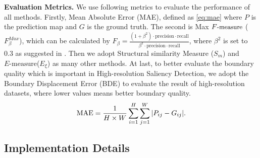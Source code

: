 \documentclass[10pt,twocolumn,letterpaper]{article}
\begin{document}
\textbf{Evaluation Metrics.}
We use following metrics to evaluate the performance of all methods. Firstly, Mean Absolute Error (MAE), defined as \cref{eq:mae} where $P$ is the prediction map and $G$ is the ground truth.  
The second is Max $\small F\text{-measure}$ ($F_{\beta}^{Max}$), which can be calculated by
$F_\beta = \frac{(1+\beta^2) \cdot \text{precision} \cdot \text{recall}}{\beta^2 \cdot \text{precision} \cdot \text{recall}}$, where $\beta^2$ is set to 0.3 as suggested in \cite{borji2015salient}. 
Then we adopt Structural similarity Measure ($S_m$) \cite{fan2017structure} and $E\text{-measure}$($E_\xi$) \cite{fan2018enhanced} as many other methods\cite{wei2020f3net,ma2021pyramidal}. 
At last, to better evaluate the boundary quality which is important in High-resolution Saliency Detection\cite{zeng2019towards,tang2021disentangled}, we adopt the Boundary Displacement Error (BDE) to evaluate the result of high-resolution datasets, where lower values means better boundary quality.
\begin{equation} \small
    \mathrm{MAE}=\frac{1}{H \times W} \sum\limits_{i=1}^{H}\sum\limits_{j=1}^W|P_{ij}-G_{ij}| .
    \label{eq:mae}
\end{equation}

\subsection{Implementation Details}
\end{document}
